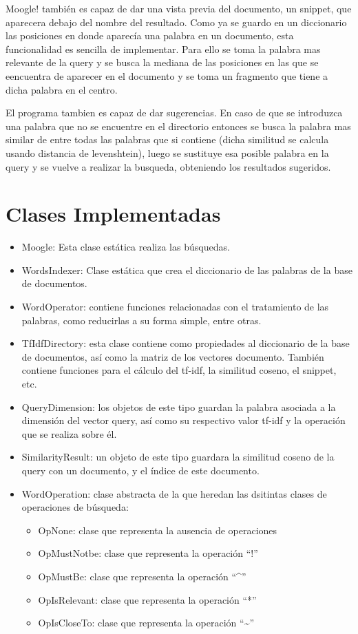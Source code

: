 \documentclass[a4paper, 12pt]{article}
\begin{document}
Moogle! también es capaz de dar una vista previa del documento, un snippet, que aparecera debajo del nombre del resultado. Como ya se guardo en un diccionario las posiciones en donde aparecía una palabra en un documento, esta funcionalidad es sencilla de implementar. Para ello se toma la
palabra mas relevante de la query y se busca la mediana de las posiciones en las que se eencuentra de aparecer en el documento y se toma un fragmento que tiene a dicha palabra en el centro.

El programa tambien es capaz de dar sugerencias. En caso de que se introduzca una palabra que no se encuentre en el directorio entonces se busca la palabra mas similar de entre todas las palabras que si contiene (dicha similitud se calcula usando distancia de levenshtein), luego se sustituye esa posible palabra en la query y se vuelve a realizar la busqueda, obteniendo los resultados sugeridos.

\section{Clases Implementadas}
\begin{itemize}
	\item Moogle: Esta clase estática realiza las búsquedas.
	\item WordsIndexer: Clase estática que crea el diccionario de las palabras de la base de documentos.
	\item WordOperator: contiene funciones relacionadas con el tratamiento de las palabras, como reducirlas a su forma simple, entre otras.
	\item TfIdfDirectory: esta clase contiene como propiedades al diccionario de la base de documentos, así como la matriz de los vectores documento. También contiene funciones para el cálculo del tf-idf, la similitud coseno, el snippet, etc.
	\item QueryDimension: los objetos de este tipo guardan la palabra asociada a la dimensión del vector query, así como su respectivo valor tf-idf y la operación que se realiza sobre él.
	\item SimilarityResult: un objeto de este tipo guardara la similitud coseno de la query con un documento, y el índice de este documento.
	\item WordOperation: clase abstracta de la que heredan las dsitintas clases de operaciones de búsqueda:
	\begin{itemize}
	\item OpNone: clase que representa la ausencia de operaciones
	\item OpMustNotbe: clase que representa la operación ``!''
	\item OpMustBe: clase que representa la operación ``\^{}''
	\item OpIsRelevant: clase que representa la operación ``*''
	\item OpIsCloseTo: clase que representa la operación ``\~{}'' 
	\end{itemize}
\end{itemize}
\end{document}
